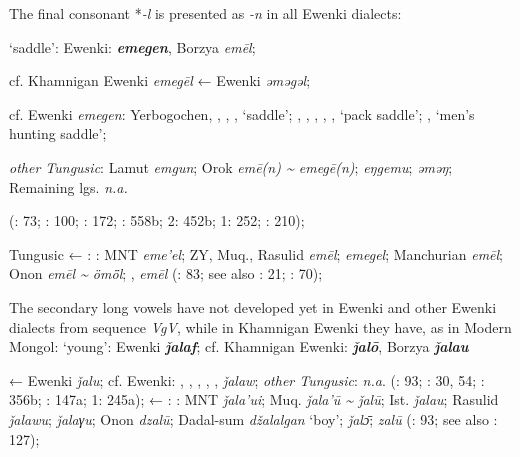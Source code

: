 \documentclass[output=paper,colorlinks,citecolor=brown]{langscibook}
\begin{document}
\ea
The final  consonant *\textit{-l} is presented as \textit{-n} in all Ewenki dialects:


\ea  ‘saddle’:  Ewenki:   \textbf{\textit{emegen}}, Borzya \textit{emēl};

    cf. Khamnigan Ewenki \textit{emegēl} ←  Ewenki \textit{ǝmǝgǝl};

    cf.  Ewenki \textit{emegen}: Yerbogochen, , , ,  ‘saddle’; , , , , ,  ‘pack saddle’; ,  ‘men’s hunting saddle’;

    \textit{other Tungusic}: Lamut \textit{emgun}; Orok \textit{emē(n) {\textasciitilde} emegē(n)};  \textit{eŋgemu};  \textit{ǝmǝŋ}; Remaining lgs. \textit{n.a.}
    
    (\citealt{Castrén1856}: 73; \citealt{Janhunen1991}: 100; \citealt{Dorji1998}: 172; \citealt{Vasilevic1958}: 558b; \citealt{Cincius1975B} 2: 452b; \citealt{Hauer1952} 1: 252; \citealt{Zikmundová2013a}: 210);

    Tungusic ← : : MNT \textit{eme’el}; ZY, Muq., Rasulid \textit{emēl};  \textit{emegel}; Manchurian  \textit{emēl}; Onon  \textit{emēl {\textasciitilde} ömȫl}; ,  \textit{emēl} (\citealt{Khabtagaeva2017}: 83; see also \citealt{Doerfer1985}: 21; \citealt{Rozycki1994}: 70);

\z 
\z
\ea
The secondary long vowels have not developed yet in  Ewenki and other Ewenki dialects from sequence \textit{VgV}, while in Khamnigan Ewenki they have, as in Modern Mongol:
\ea  ‘young’:  Ewenki \textbf{\textit{ǰalaf}}; cf. Khamnigan Ewenki:  \textbf{\textit{ǰalō}}, Borzya \textbf{\textit{ǰalau}}

    ←  Ewenki \textit{ǰalu}; cf.  Ewenki: , , , , ,  \textit{ǰalaw}; \textit{other Tungusic}: \textit{n.a}. (\citealt{Castrén1856}: 93; \citealt{Janhunen1991}: 30, 54; \citealt{Dorji1998}: 356b; \citealt{Vasilevic1958}: 147a; \citealt{Cincius1975B} 1: 245a);
    ← : : MNT \textit{\v{j}ala’ui}; Muq. \textit{\v{j}ala’ū {\textasciitilde} \v{j}alū}; Ist. \textit{\v{j}alau}; Rasulid \textit{\v{j}alawu};  \textit{ǰalaγu}; Onon  \textit{dzalū}; Dadal-sum  \textit{džalalgan} ‘boy’;  \textit{\v{j}al\={ɔ}};  \textit{zalū} (\citealt{Khabtagaeva2017}: 93; see also \citealt{Doerfer1985}: 127);
\end{document}
